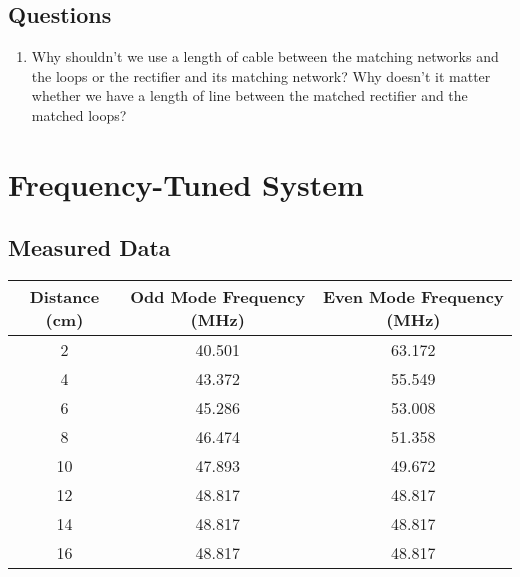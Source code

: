 \documentclass{article}
\begin{document}
\subsection{Questions}

\begin{enumerate}
	\item Why shouldn't we use a length of cable between the matching networks and the loops or the rectifier and its matching network? Why doesn't it matter whether we have a length of line between the matched rectifier and the matched loops?

\end{enumerate}


\section{Frequency-Tuned System}

\subsection{Measured Data}
\begin{table}[h]
\centering
\begin{tabular}{|c|c|c|}
\hline
Distance (cm) & Odd Mode Frequency (MHz) & Even Mode Frequency (MHz) \\ \hline
2             & 40.501                   & 63.172                    \\ \hline
4             & 43.372                   & 55.549                    \\ \hline
6             & 45.286                   & 53.008                    \\ \hline
8             & 46.474                   & 51.358                    \\ \hline
10            & 47.893                   & 49.672                    \\ \hline
12            & 48.817                   & 48.817                    \\ \hline
14            & 48.817                   & 48.817                    \\ \hline
16            & 48.817                   & 48.817                    \\ \hline
\end{tabular}
\end{table}
\end{document}
